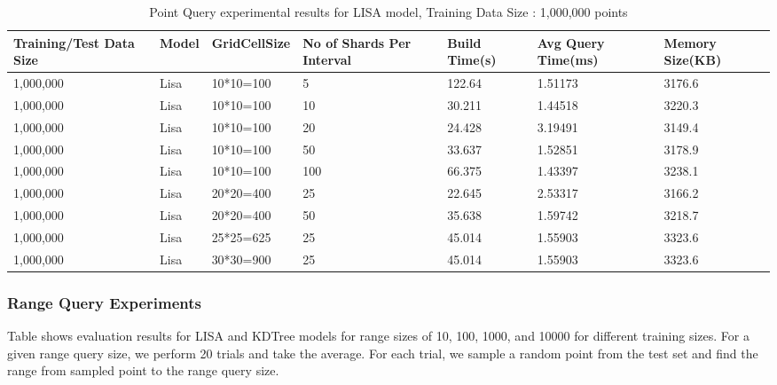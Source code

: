 \begin{table}
	\centering
	\begin{tabular}{||p{}<{\centering}|p{}<{\centering}|p{}<{\centering}| p{}<{\centering}|p{}<{\centering}|p{}<{\centering}|p{}<{\centering}||}
		\hline
		Training/Test Data Size& Model & GridCellSize & No of Shards Per Interval & Build Time(s) & Avg Query Time(ms) & Memory Size(KB)\\ [0.5ex] 
		\hline
		\hline
	 	1,000,000&Lisa& 10*10=100 & 5& 122.64& 1.51173 & 3176.6\\
		\hline
		1,000,000& Lisa& 10*10=100 & 10& 30.211& 1.44518 & 3220.3\\
		\hline
		1,000,000& Lisa& 10*10=100 & 20& 24.428&3.19491 & 3149.4\\
		\hline
		1,000,000& Lisa& 10*10=100 & 50&33.637&1.52851 & 3178.9\\
		\hline
		1,000,000& Lisa& 10*10=100 & 100& 66.375& 1.43397 & 3238.1\\
		\hline
		1,000,000& Lisa& 20*20=400 & 25& 22.645& 2.53317 & 3166.2\\
		\hline
		1,000,000& Lisa& 20*20=400 & 50& 35.638& 1.59742 & 3218.7\\
		\hline
		1,000,000& Lisa& 25*25=625 & 25& 45.014& 1.55903 & 3323.6\\
		\hline
		1,000,000& Lisa& 30*30=900 & 25& 45.014& 1.55903 & 3323.6\\
		\hline
		\hline
	\end{tabular}
	\label{baseline_search_optimization}
	\caption{Point Query experimental results for LISA model, Training Data Size : 1,000,000 points}
\end{table}

\subsubsection {Range Query Experiments}
Table shows evaluation results for LISA and KDTree models for range sizes of 10, 100, 1000, and 10000 for different training sizes. For a given range query size, we perform 20 trials and take the average. For each trial, we sample a random point from the test set and find the range from sampled point to the range query size. 

